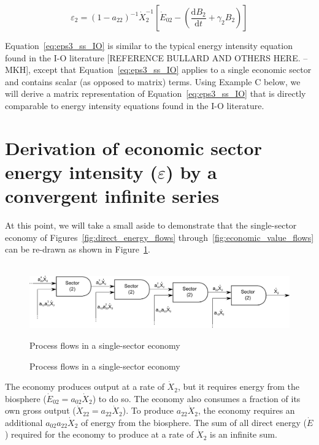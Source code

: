 \begin{equation} \label{eq:eps3_ss_IO}
	\varepsilon_{2} 
	= {(1 - a_{22})}^{-1} \dot{X}_{2}^{-1} 
	\left[\dot{E}_{02} 
	      - \left(\frac{\mathrm{d}B_{2}}{\mathrm{d}t} 
		          + \gamma_{2}B_{2}
			\right)
	\right]
\end{equation}

Equation~\ref{eq:eps3_ss_IO} is similar 
to the typical energy intensity equation 
found in the I-O literature [REFERENCE BULLARD AND OTHERS HERE. --MKH], 
except that Equation~\ref{eq:eps3_ss_IO} applies 
to a single economic sector and contains scalar 
(as opposed to matrix) terms. 
Using Example C below, we will derive 
a matrix representation of Equation~\ref{eq:eps3_ss_IO} 
that is directly comparable 
to energy intensity equations found in the I-O literature.

\section{Derivation of economic sector energy intensity ($\varepsilon$) by a convergent infinite series}

At this point, we will take a small aside 
to demonstrate that the single-sector economy 
of Figures~\ref{fig:direct_energy_flows} through~\ref{fig:economic_value_flows} 
can be re-drawn as shown in Figure~\ref{fig:single_sector_flows_3}.

\begin{figure}[h!]
\centering\
\includegraphics[width=1.0\linewidth]{Part_3/Chapter_Intensity/images/I-O_Process_Equivalence.pdf}
\caption{Process flows in a single-sector economy}{Process flows in a single-sector economy}
\label{fig:single_sector_flows_3}
\end{figure}

The economy produces output at a rate of $\dot{X}_{2}$, 
but it requires energy from the biosphere 
($\dot{E}_{02} = a_{02}\dot{X}_{2}$) to do so. 
The economy also consumes a fraction 
of its own gross output 
($\dot{X}_{22} = a_{22}\dot{X}_{2}$). 
To produce $a_{22}\dot{X}_{2}$, 
the economy requires an additional $a_{02}a_{22}\dot{X}_{2}$ 
of energy from the biosphere. 
The sum of all direct energy ($\dot{E}$) required for the economy 
to produce at a rate of $\dot{X}_{2}$ is an infinite sum.

